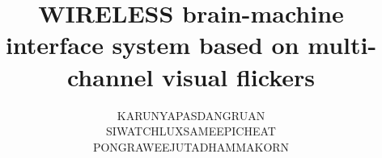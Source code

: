 \documentclass[a4paper,12pt,twoside]{report}
\begin{document}
\title{\LARGE {WIRELESS brain-machine interface system based on multi-channel visual flickers}\\
 \vspace*{6mm}
}

\author{KARUNYAPAS\qquad DANGRUAN\\
SIWATCH\qquad LUXSAMEEPICHEAT\\
PONGRAWEE\qquad JUTADHAMMAKORN\\}


\normallinespacing
\maketitle
\preface


%
%

\body









\appendix




\end{document}
